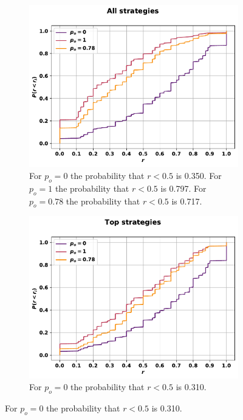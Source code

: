 \begin{figure}[!htbp]
    \begin{subfigure}{.45\textwidth}
    \includegraphics[width=\textwidth]{src/chapters/07/img/cfd_to_sequence_all_strategies.pdf}
    \caption{For \(p_o=0\) the probability that \(r<0.5\) is 0.350.
    For \(p_o=1\) the probability that \(r<0.5\) is 0.797.
    For \(p_o=0.78\) the probability that \(r<0.5\) is 0.717.}
    \end{subfigure}\hfill
    \begin{subfigure}{.45\textwidth}
    \includegraphics[width=\textwidth]{src/chapters/07/img/cfd_to_sequence_top_strategies.pdf}
    \caption{For \(p_o=0\) the probability that \(r<0.5\) is 0.310.
}
\end{subfigure}
\end{figure}

